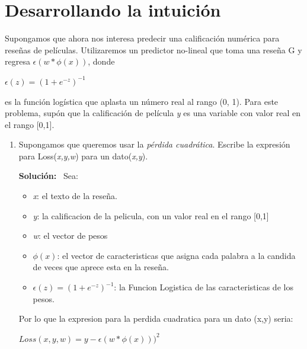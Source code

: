 \documentclass[11pt,letterpaper]{article}
\newenvironment{solution}{%
  \noindent\begin{shaded}
  \textbf{Solución:}\ }{
  \end{shaded}%
}
\begin{document}
\section*{Desarrollando la intuición}

Supongamos que ahora nos interesa predecir una calificación numérica para reseñas de películas. Utilizaremos un predictor no-lineal que toma una reseña G y regresa \begin{math}
    \epsilon(w*\phi(x))
\end{math}, donde

\begin{center}
    \begin{math}
        \epsilon(z)=(1+e^{-z})^{-1}
    \end{math}
\end{center}

es la función logística que aplasta un número real al rango (0, 1). Para este problema, supón que la calificación de película \textit{y} es una variable con valor real en el rango [0,1].

\begin{enumerate}
    \item Supongamos que queremos usar la \textit{pérdida cuadrática}. Escribe la expresión para Loss(\textit{x,y,w}) para un dato(\textit{x,y}).

    \begin{solution}
        Sea:
        \begin{itemize}
            \item \textit{x}: el texto de la reseña.
            \item \textit{y}: la calificacion de la pelicula, con un valor real en el rango [0,1]
            \item \textit{w}: el vector de pesos
            \item \begin{math}
                \phi(x)
            \end{math}: el vector de caracteristicas que asigna cada palabra a la candida de veces que aprece esta en la reseña.
            \item \begin{math}
                \epsilon(z)=(1+e^{-z})^{-1}
            \end{math}: la Funcion Logistica de las caracteristicas de los pesos.
        \end{itemize}

        Por lo que la expresion para la perdida cuadratica para un dato (x,y) seria:

    \begin{center}
        \begin{math}
            Loss(x,y,w)=y-\epsilon(w*\phi(x)))^2
        \end{math}
    \end{center}
    \end{solution}
\end{enumerate}
\end{document}
